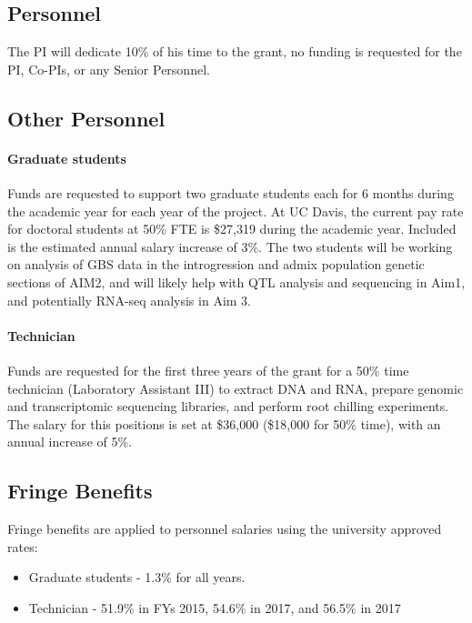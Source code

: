 
\renewcommand{\thepage}{f. Budget Justification - Page \arabic{page} of 3}


\subsection*{Personnel}

The PI will dedicate 10\% of his time to the grant, no funding is requested for the PI, Co-PIs, or any Senior Personnel.

\subsection*{Other Personnel}
\paragraph{Graduate students} 
Funds are requested to support two graduate students each for 6 months during the academic year for each year of the project. At UC Davis, the current pay rate for doctoral students at 50\% FTE is \$27,319 during the academic year. Included is the estimated annual salary increase of 3\%.  The two students will be working on analysis of GBS data in the introgression and admix population genetic sections of AIM2, and will likely help with QTL analysis and sequencing in Aim1, and potentially RNA-seq analysis in Aim 3.

\paragraph{Technician}
Funds are requested for the first three years of the grant for a 50\% time technician (Laboratory Assistant III) to extract DNA and RNA, prepare genomic and transcriptomic sequencing libraries, and perform root chilling experiments.  The salary for this positions is set at \$36,000 (\$18,000 for 50\% time), with an annual increase of 5\%.

\subsection*{Fringe Benefits}
Fringe benefits are applied to personnel salaries using the university approved rates:
\begin{itemize}
\item Graduate students - 1.3\% for all years.
\item Technician - 51.9\% in FYs 2015, 54.6\% in 2017, and 56.5\% in 2017
\end{itemize}

